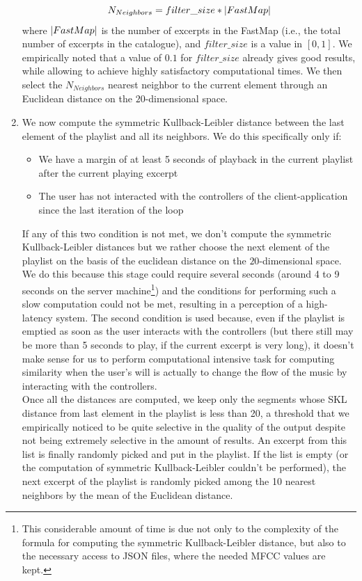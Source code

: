 \begin{enumerate}
\begin{equation}
N_{Neighbors} = filter\_size * \lvert FastMap\rvert
\end{equation} 
where $\lvert FastMap\rvert$ is the number of excerpts in the FastMap (i.e., the total number of excerpts in the catalogue), and $filter\_size$ is a value in $[0, 1]$. We empirically noted that a value of $0.1$ for $filter\_size$ already gives good results, while allowing to achieve highly satisfactory computational times. We then select the $N_{Neighbors}$ nearest neighbor to the current element through an Euclidean distance on the $20$-dimensional space. 
\item We now compute the symmetric Kullback-Leibler distance between the last element of the playlist and all its neighbors. We do this specifically only if:
\begin{itemize}
\item We have a margin of at least 5 seconds of playback in the current playlist after the current playing excerpt
\item The user has not interacted with the controllers of the client-application since the last iteration of the loop
\end{itemize}
If any of this two condition is not met, we don't compute the symmetric Kullback-Leibler distances but we rather choose the next element of the playlist on the basis of the euclidean distance on the $20$-dimensional space. We do this because this stage could require several seconds (around 4 to 9 seconds on the server machine\footnote{This considerable amount of time is due not only to the complexity of the formula for computing the symmetric Kullback-Leibler distance, but also to the necessary access to JSON files, where the needed MFCC values are kept.}) and the conditions for performing such a slow computation could not be met, resulting in a perception of a high-latency system. The second condition is used because, even if the playlist is emptied as soon as the user interacts with the controllers (but there still may be more than 5 seconds to play, if the current excerpt is very long), it doesn't make sense for us to perform computational intensive task for computing similarity when the user's will is actually to change the flow of the music by interacting with the controllers. \\ Once all the distances are computed, we keep only the segments whose SKL distance from last element in the playlist is less than 20, a threshold that we empirically noticed to be quite selective in the quality of the output despite not being extremely selective in the amount of results. An excerpt from this list is finally randomly picked and put in the playlist. If the list is empty (or the computation of symmetric Kullback-Leibler couldn't be performed), the next excerpt of the playlist is randomly picked among the 10 nearest neighbors by the mean of the Euclidean distance. 
\end{enumerate}

